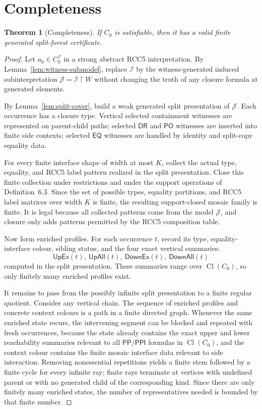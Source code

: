 \documentclass[11pt]{article}
\newtheorem{theorem}[definition]{Theorem}
\theoremstyle{remark}
\newcommand{\DR}{\mathsf{DR}}
\newcommand{\PO}{\mathsf{PO}}
\newcommand{\PP}{\mathsf{PP}}
\newcommand{\PPI}{\mathsf{PPI}}
\newcommand{\EQ}{\mathsf{EQ}}
\newcommand{\Cl}{\operatorname{Cl}}
\newcommand{\UpEx}{\mathsf{UpEx}}
\newcommand{\UpAll}{\mathsf{UpAll}}
\newcommand{\DownEx}{\mathsf{DownEx}}
\newcommand{\DownAll}{\mathsf{DownAll}}
\newcommand{\I}{\mathcal{I}}
\newcommand{\J}{\mathcal{J}}
\begin{document}
\section{Completeness}
\begin{theorem}[Completeness]\label{thm:completeness}
If $C_0$ is satisfiable, then it has a valid finite generated split-forest certificate.
\end{theorem}
\begin{proof}
Let $a_0\in C_0^\I$ in a strong abstract RCC5 interpretation.  By Lemma~\ref{lem:witness-submodel}, replace $\I$ by the witness-generated induced subinterpretation $\J=\I\upharpoonright W$ without changing the truth of any closure formula at generated elements.

By Lemma~\ref{lem:split-cover}, build a weak generated split presentation of $\J$.  Each occurrence has a closure type.  Vertical selected containment witnesses are represented on parent-child paths; selected $\DR$ and $\PO$ witnesses are inserted into finite side contexts; selected $\EQ$ witnesses are handled by identity and split-copy equality data.

For every finite interface shape of width at most $K$, collect the actual type, equality, and RCC5 label pattern realized in the split presentation.  Close this finite collection under restrictions and under the support operations of Definition~6.3.  Since the set of possible types, equality partitions, and RCC5 label matrices over width $K$ is finite, the resulting support-closed mosaic family is finite.  It is legal because all collected patterns come from the model $\J$, and closure only adds patterns permitted by the RCC5 composition table.

Now form enriched profiles.  For each occurrence $t$, record its type, equality-interface colour, sibling status, and the four exact vertical summaries:
\[
\UpEx(t),\ \UpAll(t),\ \DownEx(t),\ \DownAll(t)
\]
computed in the split presentation.  These summaries range over $\Cl(C_0)$, so only finitely many enriched profiles exist.

It remains to pass from the possibly infinite split presentation to a finite regular quotient.  Consider any vertical chain.  The sequence of enriched profiles and concrete context colours is a path in a finite directed graph.  Whenever the same enriched state recurs, the intervening segment can be blocked and repeated with fresh occurrences, because the state already contains the exact upper and lower reachability summaries relevant to all $\PP/\PPI$ formulas in $\Cl(C_0)$, and the context colour contains the finite mosaic interface data relevant to side interaction.  Removing nonessential repetitions yields a finite stem followed by a finite cycle for every infinite ray; finite rays terminate at vertices with undefined parent or with no generated child of the corresponding kind.  Since there are only finitely many enriched states, the number of representatives needed is bounded by that finite number.


\end{proof}
\end{document}
